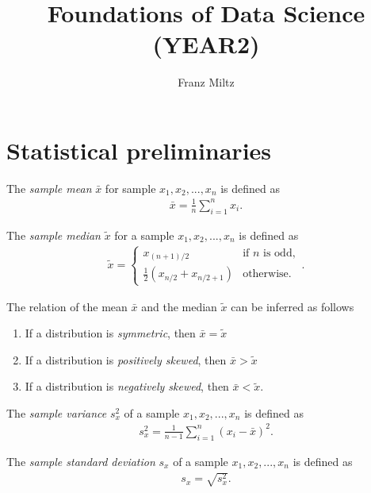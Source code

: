 \documentclass{article}
\begin{document}
\title{Foundations of Data Science (YEAR2)}
\author{Franz Miltz}
\maketitle
\tableofcontents
\pagebreak
\section{Statistical preliminaries}
\begin{definition}
	The \emph{sample mean} $\bar{x}$ for sample $x_1, x_2, ..., x_n$
	is defined as
	\begin{align*}
		\bar{x} = \frac{1}{n}\sum_{i=1}^n x_i.
	\end{align*}
\end{definition}
\begin{definition}
	The \emph{sample median} $\tilde x$ for a sample $x_1, x_2, ..., x_n$ is defined as 
	\begin{align*}
		\tilde x = \begin{cases}
			x_{(n+1)/2} 				   &\text{if $n$ is odd},\\
			\frac{1}{2}(x_{n/2}+x_{n/2+1}) &\text{otherwise}.
		\end{cases}.
	\end{align*}
\end{definition}
\begin{theorem}
	The relation of the mean $\bar x$ and the median $\tilde x$ can be inferred as follows
	\begin{enumerate}
		\item If a distribution is \emph{symmetric}, then $\bar x = \tilde x$
		\item If a distribution is \emph{positively skewed}, then $\bar x > \tilde x$
		\item If a distribution is \emph{negatively skewed}, then $\bar x < \tilde x$.
	\end{enumerate}
\end{theorem}
\begin{definition}
	The \emph{sample variance} $s_x^2$ of a sample $x_1, x_2, ..., x_n$ is defined as
	\begin{align*}
		s_x^2 = \frac{1}{n-1}\sum_{i=1}^n (x_i-\bar x)^2.
	\end{align*}
\end{definition}
\begin{definition}
	The \emph{sample standard deviation} $s_x$ of a sample $x_1, x_2, ..., x_n$ is defined as
	\begin{align*}
		s_x = \sqrt{s_x^2}.
	\end{align*}
\end{definition}
\end{document}

